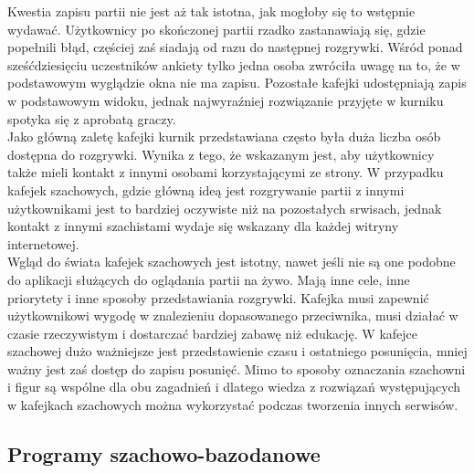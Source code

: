 \documentclass[12pt,leqno]{article}
\begin{document}
Kwestia zapisu partii nie jest aż tak istotna, jak mogłoby się to wstępnie wydawać. Użytkownicy po skończonej partii rzadko zastanawiają się, gdzie popełnili błąd, częściej zaś siadają od razu do następnej rozgrywki. Wśród ponad sześćdziesięciu uczestników ankiety tylko jedna osoba zwróciła uwagę na to, że w podstawowym wyglądzie okna nie ma zapisu. Pozostałe kafejki udostępniają zapis w podstawowym widoku, jednak najwyraźniej rozwiązanie przyjęte w kurniku spotyka się z aprobatą graczy.\\
Jako główną zaletę kafejki kurnik przedstawiana często była duża liczba osób dostępna do rozgrywki. Wynika z tego, że wskazanym jest, aby użytkownicy także mieli kontakt z innymi osobami korzystającymi ze strony. W przypadku kafejek szachowych, gdzie główną ideą jest rozgrywanie partii z innymi użytkownikami jest to bardziej oczywiste niż na pozostałych srwisach, jednak kontakt z innymi szachistami wydaje się wskazany dla każdej witryny internetowej.  \\
\indent Wgląd do świata kafejek szachowych jest istotny, nawet jeśli nie są one podobne do aplikacji służących do oglądania partii na żywo. Mają inne cele, inne priorytety i inne sposoby przedstawiania rozgrywki. Kafejka musi zapewnić użytkownikowi wygodę w znalezieniu dopasowanego przeciwnika, musi działać w czasie rzeczywistym i dostarczać bardziej zabawę niż edukację. W kafejce szachowej dużo ważniejsze jest przedstawienie czasu i ostatniego posunięcia, mniej ważny jest zaś dostęp do zapisu posunięć. Mimo to sposoby oznaczania szachowni i figur są wspólne dla obu zagadnień i dlatego wiedza z rozwiązań występujących w kafejkach szachowych można wykorzystać podczas tworzenia innych serwisów.


\subsection{Programy szachowo-bazodanowe}
\end{document}
